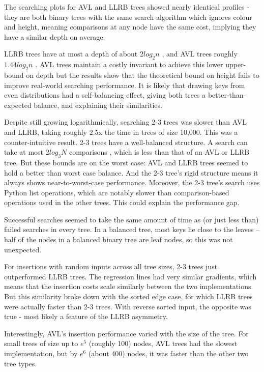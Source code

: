 \documentclass[12pt]{article}
\begin{document}
The searching plots for AVL and LLRB trees showed nearly identical profiles - they are both binary trees with the same search algorithm which ignores colour and height, meaning comparisons at any node have the same cost, implying they have a similar depth on average.

LLRB trees have at most a depth of about $2log_2n$  \cite{sedgewick}, and AVL trees roughly $1.44log_2n$ \cite{mount}.
AVL trees maintain a costly invariant to achieve this lower upper-bound on depth but the results show that the theoretical bound on height fails to improve real-world searching performance. It is likely that drawing keys from even distributions had a self-balancing effect, giving both trees a better-than-expected balance, and explaining their similarities.

Despite still growing logarithmically, searching 2-3 trees was slower than AVL and LLRB, taking roughly $2.5$x the time in trees of size 10,000. This was a counter-intuitive result. 2-3 trees have a well-balanced structure. A search can take at most $2log_3N$ comparisons \cite{algorithms}, which is less than that of an AVL or LLRB tree. But these bounds are on the worst case: AVL and LLRB trees seemed to hold a better than worst case balance. And the 2-3 tree’s rigid structure means it always shows near-to-worst-case performance. Moreover, the 2-3 tree’s search uses Python list operations, which are notably slower than comparison-based operations used in the other trees. This could explain the performance gap.

Successful searches seemed to take the same amount of time as (or just less than) failed searches in every tree. In a balanced tree, most keys lie close to the leaves – half of the nodes in a balanced binary tree are leaf nodes, so this was not unexpected. 

For insertions with random inputs across all tree sizes, 2-3 trees just outperformed LLRB trees. The regression lines had very similar gradients, which means that the insertion costs scale similarly between the two implementations. But this similarity broke down with the sorted edge case, for which LLRB trees were actually faster than 2-3 trees. With reverse sorted input, the opposite was true - most likely a feature of the LLRB asymmetry.

Interestingly, AVL's insertion performance varied with the size of the tree. For small trees of size up to $e^5$ (roughly 100) nodes, AVL trees had the slowest implementation, but by $e^6$ (about 400) nodes, it was faster than the other two tree types. 
\end{document}
